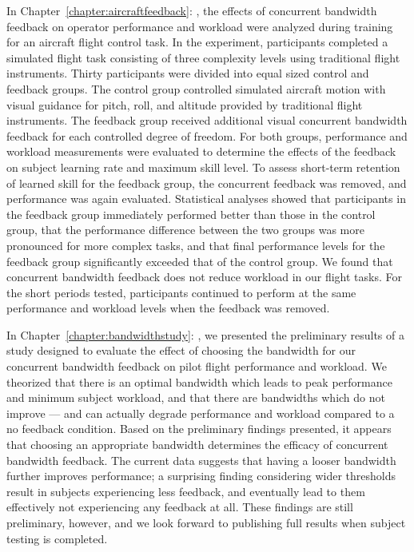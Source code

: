 In Chapter~\ref{chapter:aircraftfeedback}: , the effects of concurrent bandwidth feedback on operator performance and workload were analyzed during training for an aircraft flight control task.
In the experiment, participants completed a simulated flight task consisting of three complexity levels using traditional flight instruments.
Thirty participants were divided into equal sized control and feedback groups.
The control group controlled simulated aircraft motion with visual guidance for pitch, roll, and altitude provided by traditional flight instruments.
The feedback group received additional visual concurrent bandwidth feedback for each controlled degree of freedom.
For both groups, performance and workload measurements were evaluated to determine the effects of the feedback on subject learning rate and maximum skill level.
To assess short-term retention of learned skill for the feedback group, the concurrent feedback was removed, and performance was again evaluated.
Statistical analyses showed that participants in the feedback group immediately performed better than those in the control group, that the performance difference between the two groups was more pronounced for more complex tasks, and that final performance levels for the feedback group significantly exceeded that of the control group.
We found that concurrent bandwidth feedback does not reduce workload in our flight tasks.
For the short periods tested, participants continued to perform at the same performance and workload levels when the feedback was removed.

In Chapter~\ref{chapter:bandwidthstudy}: , we presented the preliminary results of a study designed to evaluate the effect of choosing the bandwidth for our concurrent bandwidth feedback on pilot flight performance and workload.
We theorized that there is an optimal bandwidth which leads to peak performance and minimum subject workload, and that there are bandwidths which do not improve --- and can actually degrade performance and workload compared to a no feedback condition.
Based on the preliminary findings presented, it appears that choosing an appropriate bandwidth determines the efficacy of concurrent bandwidth feedback.
The current data suggests that having a looser bandwidth further improves performance; a surprising finding considering wider thresholds result in subjects experiencing less feedback, and eventually lead to them effectively not experiencing any feedback at all.
These findings are still preliminary, however, and we look forward to publishing full results when subject testing is completed.

